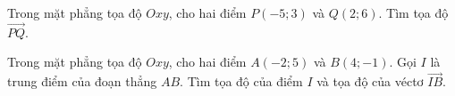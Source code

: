 \begin{bt}%
	Trong mặt phẳng tọa độ $Oxy$, cho hai điểm $P(-5; 3)$ và $Q(2; 6)$. Tìm tọa độ $\overrightarrow{PQ}$.
\end{bt}

\begin{bt}%
	Trong mặt phẳng tọa độ $Oxy$, cho hai điểm $A(-2; 5)$ và $B(4; -1)$. Gọi $I$ là trung điểm của đoạn thẳng $AB$. Tìm tọa độ của điểm $I$ và tọa độ của véctơ $\overrightarrow{IB}$.
\end{bt}

